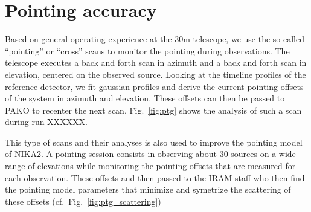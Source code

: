 \section{Pointing accuracy}
\label{se:pointing}

Based on general operating experience at the 30m telescope, we use the so-called
``pointing'' or ``cross'' scans to monitor the pointing during observations. The
telescope executes a back and forth scan in azimuth and a back and forth scan in
elevation, centered on the observed source. Looking at the timeline profiles of
the reference detector, we fit gaussian profiles and derive the current pointing
offsets of the system in azimuth and elevation. These offsets can then be passed
to PAKO to recenter the next scan. Fig.~\ref{fig:ptg} shows the analysis of
such a scan during run XXXXXX.

This type of scans and their analyses is also used to improve the pointing model
of NIKA2. A pointing session consists in observing about 30 sources on a wide
range of elevations while monitoring the pointing offsets that are measured for
each observation. These offsets and then passed to the IRAM staff who then find
the pointing model parameters that minimize and symetrize the scattering of
these offsets (cf.~Fig.~\ref{fig:ptg_scattering})
